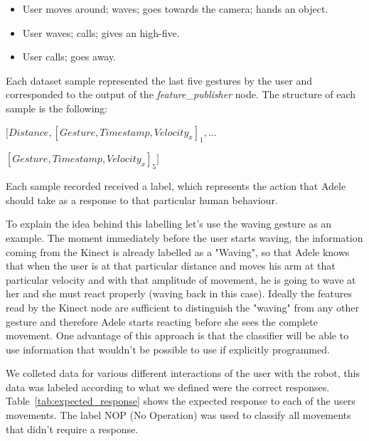 \begin{itemize}
\item User moves around; waves; goes towards the camera; hands an object.
\item User waves; calls; gives an high-five.
\item User calls; goes away.
\end{itemize}

Each dataset sample represented the last five gestures by the user and corresponded to the output of the \textit{feature\_publisher} node. The structure of each sample is the following:

\vspace*{4pt}
$\Big[Distance, [Gesture, Timestamp, Velocity_x]_1,...$

$[Gesture, Timestamp, Velocity_x]_5\Big]$
\vspace*{4pt}

Each sample recorded received a label, which represents the action that Adele should take as a response to that particular human behaviour.

To explain the idea behind this labelling let's use the waving gesture as an example. The moment immediately before the user starts waving, the information coming from the Kinect is already labelled as a "Waving", so that Adele knows that when the user is at that particular distance and moves his arm at that particular velocity and with that amplitude of movement, he is going to wave at her and she must react properly (waving back in this case). Ideally the features read by the Kinect node are sufficient to distinguish the "waving" from any other gesture and therefore Adele starts reacting before she sees the complete movement. One advantage of this approach is that the classifier will be able to use information that wouldn't be possible to use if explicitly programmed.

We colleted data for various different interactions of the user with the robot, this data was labeled according to what we defined were the correct responses. Table~\ref{tab:expected_response} shows the expected response to each of the users movements. The label NOP (No Operation) was used to classify all movements that didn't require a response.

